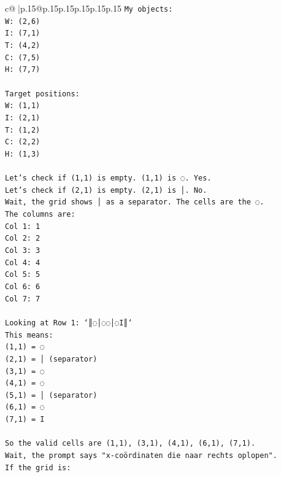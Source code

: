 \documentclass{article}
\begin{document}
{\begin{supertabular}{c@{$\;$}|p{.15\linewidth}@{}p{.15\linewidth}p{.15\linewidth}p{.15\linewidth}p{.15\linewidth}p{.15\linewidth}}
{{{\texttt{My objects:} \\
\texttt{W: (2,6)} \\
\texttt{I: (7,1)} \\
\texttt{T: (4,2)} \\
\texttt{C: (7,5)} \\
\texttt{H: (7,7)} \\
\\ 
\texttt{Target positions:} \\
\texttt{W: (1,1)} \\
\texttt{I: (2,1)} \\
\texttt{T: (1,2)} \\
\texttt{C: (2,2)} \\
\texttt{H: (1,3)} \\
\\ 
\texttt{Let's check if (1,1) is empty. (1,1) is ◌. Yes.} \\
\texttt{Let's check if (2,1) is empty. (2,1) is │. No.} \\
\texttt{Wait, the grid shows │ as a separator. The cells are the ◌.} \\
\texttt{The columns are:} \\
\texttt{Col 1: 1} \\
\texttt{Col 2: 2} \\
\texttt{Col 3: 3} \\
\texttt{Col 4: 4} \\
\texttt{Col 5: 5} \\
\texttt{Col 6: 6} \\
\texttt{Col 7: 7} \\
\\ 
\texttt{Looking at Row 1: `║◌│◌◌│◌I║`} \\
\texttt{This means:} \\
\texttt{(1,1) = ◌} \\
\texttt{(2,1) = │ (separator)} \\
\texttt{(3,1) = ◌} \\
\texttt{(4,1) = ◌} \\
\texttt{(5,1) = │ (separator)} \\
\texttt{(6,1) = ◌} \\
\texttt{(7,1) = I} \\
\\ 
\texttt{So the valid cells are (1,1), (3,1), (4,1), (6,1), (7,1).} \\
\texttt{Wait, the prompt says "x{-}coördinaten die naar rechts oplopen".} \\
\texttt{If the grid is:} \\
}}}
\end{supertabular}}
\end{document}

